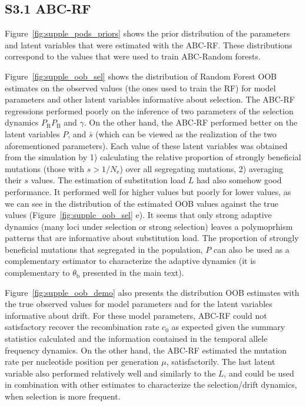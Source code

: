 \documentclass[a4paper, 12pt]{article}
\begin{document}
\subsection*{S3.1 ABC-RF}

Figure~\ref{fig:supple_pods_priors} shows the prior distribution of the parameters and latent variables that were estimated with the ABC-RF. These distributions correspond to the values that were used to train ABC-Random forests. 

Figure~\ref{fig:supple_oob_sel} shows the distribution of Random Forest OOB estimates on the observed values (the ones used to train the RF) for model parameters and other latent variables informative about selection. The ABC-RF regressions performed poorly on the inference of two parameters of the selection dynamics $P_{\mathrm{R}}P_{\mathrm{B}}$ and $\gamma$. On the other hand, the ABC-RF performed better on the latent variables $P$, and $\bar{s}$ (which can be viewed as the realization of the two aforementioned parameters). Each value of these latent variables was obtained from the simulation by 1) calculating the relative proportion of strongly beneficial mutations (those with $s > 1/N_{\mathrm{e}}$) over all segregating mutations, 2) averaging their $s$ values. 
The estimation of substitution load $L$ had also somehow good performance. It performed well for higher values but poorly for lower values, as we can see in the distribution of the estimated OOB values against the true values (Figure~\ref{fig:supple_oob_sel} e). It seems that only strong adaptive dynamics (many loci under selection or strong selection) leaves a polymoprhism patterns that are informative about substitution load. The proportion of strongly beneficial mutations that segregated in the population, $P$ can also be used as a complementary estimator to characterize the adaptive dynamics (it is complementary to $\theta_{\mathrm{b}}$ presented in the main text). 

Figure~\ref{fig:supple_oob_demo} also presents the distribution OOB estimates with the true observed values for model parameters and for the latent variables informative about drift. For these model parameters, ABC-RF could not satisfactory recover the recombination rate $c_{\mathrm{0}}$ as expected given the summary statistics calculated and the information contained in the temporal allele frequency dynamics. On the other hand, the ABC-RF estimated the mutation rate per nucleotide position per generation $\mu$, satisfactorily. The last latent variable also performed relatively well and similarly to the $L$, and could be used in combination with other estimates to characterize the selection/drift dynamics, when selection is more frequent. 
\end{document}
